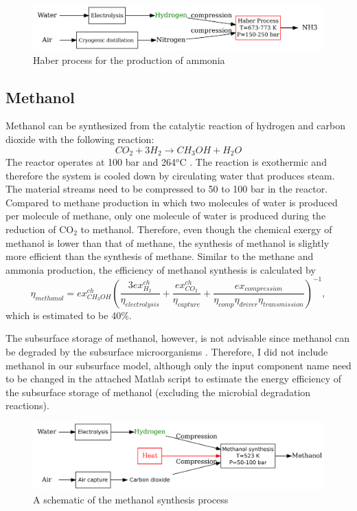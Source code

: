 \documentclass{ECOS_2021}
\begin{document}
\begin{figure}[H]
\centering
\includegraphics[width=12cm]{haber}

\caption{\label{fig:Haber-process}Haber process for the production of ammonia\cite{eftekhariQuantifyingRoleLiquid2020}}
\end{figure}

\sffamily \subsection{Methanol}
\normalsize
Methanol can be synthesized from the catalytic reaction of hydrogen
and carbon dioxide with the following reaction:
\begin{equation}
CO_{2}+3H_{2}\rightarrow CH_{3}OH+H_{2}O\label{eq:methanol}
\end{equation}
 The reactor operates at 100 bar and 264$^{o}$C \cite{luybenDesignControlMethanol2010}.
The reaction is exothermic and therefore the system is cooled down
by circulating water that produces steam. The material streams need
to be compressed to 50 to 100 bar in the reactor. Compared to methane
production in which two molecules of water is produced per molecule
of methane, only one molecule of water is produced during the reduction
of CO$_{2}$ to methanol. Therefore, even though the chemical exergy
of methanol is lower than that of methane, the synthesis of methanol
is slightly more efficient than the synthesis of methane. Similar
to the methane and ammonia production, the efficiency of methanol
synthesis is calculated by
\[
\eta_{methanol}=ex_{CH_{3}OH}^{ch}\left(\frac{3ex_{H_{2}}^{ch}}{\eta_{electrolysis}}+\frac{ex_{CO_{2}}^{ch}}{\eta_{capture}}+\frac{ex_{compression}}{\eta_{comp}\eta_{driver}\eta_{transmission}}\right)^{-1},
\]
which is estimated to be 40\%.

The subsurface storage of methanol, however, is not advisable since
methanol can be degraded by the subsurface microorganisms \cite{sousaDeepsubsurfaceSulfateReducer2018}.
Therefore, I did not include methanol in our subsurface model, although
only the input component name need to be changed in the attached Matlab
script to estimate the energy efficiency of the subsurface storage
of methanol (excluding the microbial degradation reactions). 

\begin{figure}[H]
\centering
\includegraphics[width=12cm]{methanol}

\caption{A schematic of the methanol synthesis process \cite{eftekhariQuantifyingRoleLiquid2020}}
\end{figure}
\end{document}

